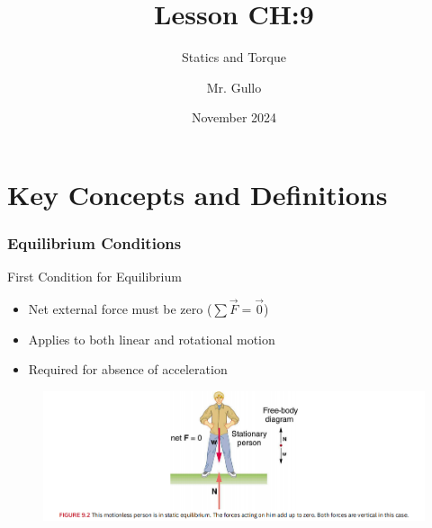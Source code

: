 \documentclass{beamer}
\title{Lesson CH:9}
\subtitle{Statics and Torque}
\author{Mr. Gullo}
\date{November 2024}
\begin{document}
\frame{\titlepage}

\section{Key Concepts and Definitions}
\begin{frame}
\frametitle{Equilibrium Conditions}

\begin{block}{First Condition for Equilibrium}
\begin{itemize}
    \item Net external force must be zero ($\sum \vec{F} = \vec{0}$)
    \item Applies to both linear and rotational motion
    \item Required for absence of acceleration
\end{itemize}
\end{block}

\begin{figure}
    \centering
    \includegraphics[width=0.8\linewidth]{CH9/Screenshot 2024-11-04 115835.png}
\end{figure}
\end{frame}
\end{document}
